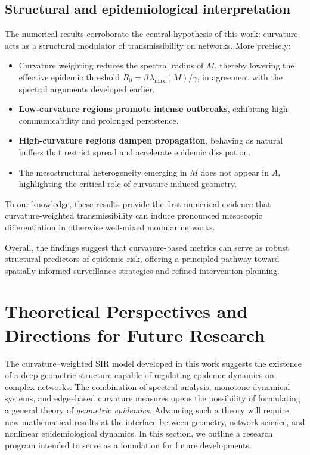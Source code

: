 \documentclass[final,3p,times,twocolumn]{elsarticle}
\begin{document}
\subsection{Structural and epidemiological interpretation}

The numerical results corroborate the central hypothesis of this work: curvature acts as a structural modulator of transmissibility on networks. More precisely:

\begin{itemize}[label=--]
    \item Curvature weighting reduces the spectral radius of $M$, thereby lowering the effective epidemic threshold
    $R_0 = \beta\, \lambda_{\max}(M)/\gamma$, in agreement with the spectral arguments developed earlier.
    \item \textbf{Low-curvature regions promote intense outbreaks}, exhibiting high communicability and prolonged persistence.
    \item \textbf{High-curvature regions dampen propagation}, behaving as natural buffers that restrict spread and accelerate epidemic dissipation.
    \item The mesostructural heterogeneity emerging in $M$ does not appear in $A$, highlighting the critical role of curvature-induced geometry.
\end{itemize}

To our knowledge, these results provide the first numerical evidence that curvature-weighted transmissibility can induce pronounced mesoscopic differentiation in otherwise well-mixed modular networks.

Overall, the findings suggest that curvature-based metrics can serve as robust structural predictors of epidemic risk, offering a principled pathway toward spatially informed surveillance strategies and refined intervention planning.

\section{Theoretical Perspectives and Directions for Future Research}

The curvature–weighted SIR model developed in this work suggests the existence
of a deep geometric structure capable of regulating epidemic dynamics on complex
networks. The combination of spectral analysis, monotone dynamical systems, and
edge–based curvature measures opens the possibility of formulating a general
theory of \emph{geometric epidemics}. Advancing such a theory will require new
mathematical results at the interface between geometry, network science, and
nonlinear epidemiological dynamics. In this section, we outline a research
program intended to serve as a foundation for future developments.
\end{document}
